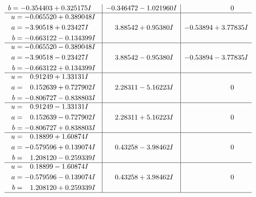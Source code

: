 \documentclass[1p]{elsarticle_modified}
\theoremstyle{definition}
\begin{document}
$$\begin{array}{c|c|c}
\begin{aligned}
b &= -0.354403 + 0.325175 I\end{aligned}
 & -0.346472 - 1.021960 I & \phantom{-0.000000 } 0 \\ \hline\begin{aligned}
u &= -0.065520 + 0.389048 I \\
a &= -3.90518 + 0.23427 I \\
b &= -0.663122 - 0.134399 I\end{aligned}
 & \phantom{-}3.88542 + 0.95380 I & -0.53894 + 3.77835 I \\ \hline\begin{aligned}
u &= -0.065520 - 0.389048 I \\
a &= -3.90518 - 0.23427 I \\
b &= -0.663122 + 0.134399 I\end{aligned}
 & \phantom{-}3.88542 - 0.95380 I & -0.53894 - 3.77835 I \\ \hline\begin{aligned}
u &= \phantom{-}0.91249 + 1.33131 I \\
a &= \phantom{-}0.152639 + 0.727902 I \\
b &= -0.806727 - 0.838803 I\end{aligned}
 & \phantom{-}2.28311 - 5.16223 I & \phantom{-0.000000 } 0 \\ \hline\begin{aligned}
u &= \phantom{-}0.91249 - 1.33131 I \\
a &= \phantom{-}0.152639 - 0.727902 I \\
b &= -0.806727 + 0.838803 I\end{aligned}
 & \phantom{-}2.28311 + 5.16223 I & \phantom{-0.000000 } 0 \\ \hline\begin{aligned}
u &= \phantom{-}0.18899 + 1.60874 I \\
a &= -0.579596 + 0.139074 I \\
b &= \phantom{-}1.208120 - 0.259339 I\end{aligned}
 & \phantom{-}0.43258 - 3.98462 I & \phantom{-0.000000 } 0 \\ \hline\begin{aligned}
u &= \phantom{-}0.18899 - 1.60874 I \\
a &= -0.579596 - 0.139074 I \\
b &= \phantom{-}1.208120 + 0.259339 I\end{aligned}
 & \phantom{-}0.43258 + 3.98462 I & \phantom{-0.000000 } 0\\
 \hline 
 \end{array}$$\newpage$$\begin{array}{c|c|c}  

\end{array}$$
\end{document}
